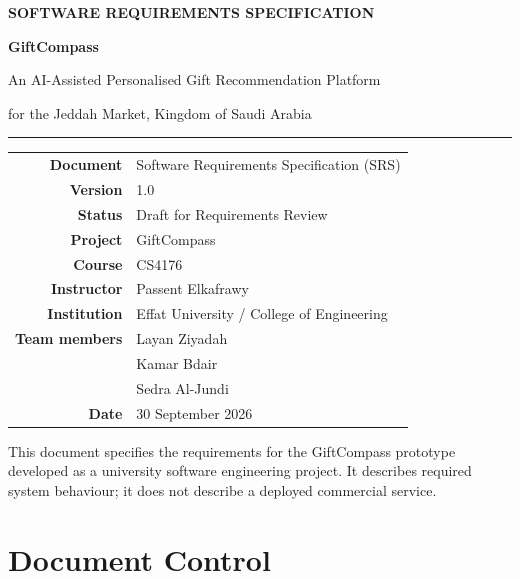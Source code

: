 \documentclass[11pt,a4paper]{report}
\begin{document}
\begin{titlepage}
\centering
\vspace*{1.5cm}
{\Large\bfseries\color{gcBerry} SOFTWARE REQUIREMENTS SPECIFICATION\par}
\vspace{1.2cm}
{\Huge\bfseries\color{gcInk} GiftCompass\par}
\vspace{0.5cm}
{\large\color{gcInk} An AI-Assisted Personalised Gift Recommendation Platform\par}
{\large\color{gcInk} for the Jeddah Market, Kingdom of Saudi Arabia\par}
\vspace{1.0cm}
{\color{gcGrid}\rule{0.75\textwidth}{1pt}}
\vspace{1.0cm}

\begin{tabular}{@{}rl@{}}
\textbf{Document}        & Software Requirements Specification (SRS) \\
\textbf{Version}         & 1.0 \\
\textbf{Status}          & Draft for Requirements Review \\
\textbf{Project}         & GiftCompass \\
\textbf{Course}          & CS4176 \\
\textbf{Instructor}      & Passent Elkafrawy \\
\textbf{Institution}     & Effat University / College of Engineering \\
\textbf{Team members}    & Layan Ziyadah \\
                         & Kamar Bdair \\
                         & Sedra Al-Jundi \\
\textbf{Date}            & 30 September 2026 \\
\end{tabular}

\vfill
{\small\color{gcInk!70}
This document specifies the requirements for the GiftCompass prototype developed as a
university software engineering project. It describes required system behaviour; it does
not describe a deployed commercial service.\par}
\end{titlepage}

\chapter*{Document Control}
\end{document}
